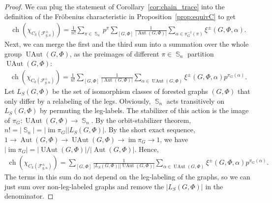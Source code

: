 \documentclass[10pt,a4paper]{amsart}
\DeclareMathOperator{\SG}{{\mathbb S}}
\DeclareMathOperator{\im}{im}
\newcommand{\Aut}{{\operatorname{Aut}}}
\newcommand{\F}{\mathcal{F}}
\newcommand{\UAut}{{\operatorname{UAut}}}
\newcommand{\ch}{\operatorname{ch}}
\begin{document}
\begin{proof}
We can plug the statement of Corollary~\ref{cor:chain_trace} into the definition of the Fr\"obenius characteristic in Proposition~\ref{prop:equivC} to get
\begin{align*} \ch(\chi_{C_k(\F^\pm_{g,n})}) = \frac{1}{n!} \sum_{\pi \in \SG_n} p^\pi \sum_{[G,\Phi]} \frac{1}{|\Aut(G,\Phi)|} \sum_{\alpha \in \pi_G^{-1}(\pi)} \xi^\pm(G,\Phi,\alpha). \end{align*}
%
Next, we can merge the first and the third sum into a summation over the whole group $\UAut(G,\Phi)$, 
as the preimages of different $\pi \in \SG_n$ partition $\UAut(G,\Phi)$:
\begin{align*} \ch(\chi_{C_k(\F^\pm_{g,n})}) = \frac{1}{n!} \sum_{[G,\Phi]} \frac{1}{|\Aut(G,\Phi)|} \sum_{\alpha \in \UAut(G,\Phi)} \xi^\pm(G,\Phi,\alpha) p^{\pi_G(\alpha)} . \end{align*}
Let $L_S(G,\Phi)$ be the set of isomorphism classes of forested graphs $(G,\Phi)$ that only differ by a relabeling of the legs.
%
%
%
%
%
%
Obviously, $\SG_n$ acts transitively on $L_S(G,\Phi)$ by permuting the leg-labels.  The stabilizer of this action is the image of $\pi_G:\UAut(G,\Phi)\rightarrow \SG_n$.
By the orbit-stabilizer theorem, $n! = |\SG_n| = |\im \pi_G| |L_S(G,\Phi)|$.
By the short exact sequence, $1 \rightarrow \Aut(G,\Phi) \rightarrow \UAut(G,\Phi ) \rightarrow \im \pi_G \rightarrow 1$, we have $|\im \pi_G| = |\UAut(G,\Phi)|/ |\Aut(G,\Phi)|$. Hence,
\begin{align*} \ch(\chi_{C_k(\F^\pm_{g,n})}) = \sum_{[G,\Phi]} \frac{1}{|L_S(G,\Phi)| |\UAut(G,\Phi)|} \sum_{\alpha \in \UAut(G,\Phi)} \xi^\pm(G,\Phi,\alpha) p^{\pi_G(\alpha)} . \end{align*}
The terms in this sum do not depend on the leg-labeling of the graphs, so we can just sum over non-leg-labeled graphs and remove the $|L_S(G,\Phi)|$ in the denominator.
\end{proof}
\end{document}
